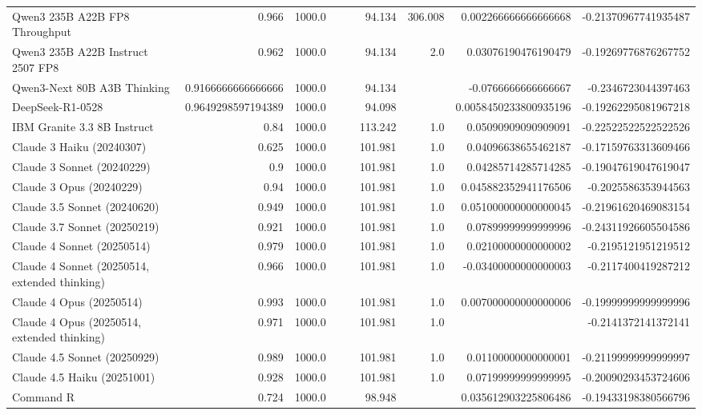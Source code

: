\begin{table}[htp]
{\begin{tabular}{lrrrrrrrr}
Qwen3 235B A22B FP8 Throughput & 0.966 & 1000.0 &  &  & 94.134 & 306.008 & 0.002266666666666668 & -0.21370967741935487 \\
Qwen3 235B A22B Instruct 2507 FP8 & 0.962 & 1000.0 &  &  & 94.134 & 2.0 & 0.03076190476190479 & -0.19269776876267752 \\
Qwen3-Next 80B A3B Thinking & 0.9166666666666666 & 1000.0 &  &  & 94.134 &  & -0.0766666666666667 & -0.2346723044397463 \\
DeepSeek-R1-0528 & 0.9649298597194389 & 1000.0 &  &  & 94.098 &  & 0.0058450233800935196 & -0.19262295081967218 \\
IBM Granite 3.3 8B Instruct & 0.84 & 1000.0 &  &  & 113.242 & 1.0 & 0.05090909090909091 & -0.22522522522522526 \\
Claude 3 Haiku (20240307) & 0.625 & 1000.0 &  &  & 101.981 & 1.0 & 0.04096638655462187 & -0.17159763313609466 \\
Claude 3 Sonnet (20240229) & 0.9 & 1000.0 &  &  & 101.981 & 1.0 & 0.04285714285714285 & -0.19047619047619047 \\
Claude 3 Opus (20240229) & 0.94 & 1000.0 &  &  & 101.981 & 1.0 & 0.045882352941176506 & -0.2025586353944563 \\
Claude 3.5 Sonnet (20240620) & 0.949 & 1000.0 &  &  & 101.981 & 1.0 & 0.051000000000000045 & -0.21961620469083154 \\
Claude 3.7 Sonnet (20250219) & 0.921 & 1000.0 &  &  & 101.981 & 1.0 & 0.07899999999999996 & -0.24311926605504586 \\
Claude 4 Sonnet (20250514) & 0.979 & 1000.0 &  &  & 101.981 & 1.0 & 0.02100000000000002 & -0.2195121951219512 \\
Claude 4 Sonnet (20250514, extended thinking) & 0.966 & 1000.0 &  &  & 101.981 & 1.0 & -0.03400000000000003 & -0.2117400419287212 \\
Claude 4 Opus (20250514) & 0.993 & 1000.0 &  &  & 101.981 & 1.0 & 0.007000000000000006 & -0.19999999999999996 \\
Claude 4 Opus (20250514, extended thinking) & 0.971 & 1000.0 &  &  & 101.981 & 1.0 &  & -0.2141372141372141 \\
Claude 4.5 Sonnet (20250929) & 0.989 & 1000.0 &  &  & 101.981 & 1.0 & 0.01100000000000001 & -0.21199999999999997 \\
Claude 4.5 Haiku (20251001) & 0.928 & 1000.0 &  &  & 101.981 & 1.0 & 0.07199999999999995 & -0.20090293453724606 \\
Command R & 0.724 & 1000.0 &  &  & 98.948 &  & 0.035612903225806486 & -0.19433198380566796 \\

\end{tabular}}
\end{table}
